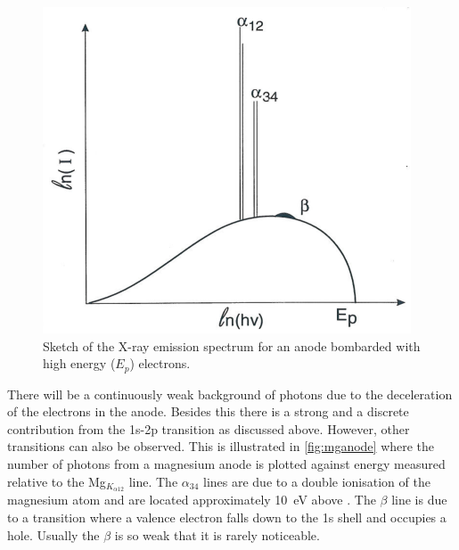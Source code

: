\begin{figure}[h!]
	\begin{center}
	\includegraphics[scale=3.5]{figures/04_05.png}
	\caption{Sketch of the X-ray emission spectrum for an anode bombarded with high energy ($E_p$) electrons.}
	\label{fig:highenergybomb}
	\end{center}
\end{figure}

There will be a continuously weak background of photons due to the deceleration of the electrons in the anode. Besides this there is a strong and a discrete contribution from the 1s-2p transition as discussed above. However, other transitions can also be observed. This is illustrated in \autoref{fig:mganode} where the number of photons from a magnesium anode is plotted against energy measured relative to the Mg$_{K_{\alpha 12}}$ line. The $\alpha_{34}$ lines are due to a double ionisation of the magnesium atom and are located approximately \SI{10}{\electronvolt} above \cite{krause}. The $\beta$ line is due to a transition where  a valence electron falls down to the 1s shell and occupies a hole. Usually the $\beta$ is so weak that it is rarely noticeable.

